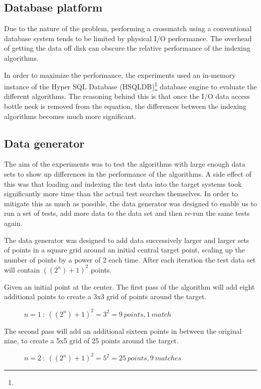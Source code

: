 \documentclass{article}
\newcommand{\hsqldb} {HSQLDB\xspace}
\newcommand{\crossmatch} {crossmatch\xspace}
\newcommand{\hdisk} {disk\xspace}
\newcommand{\footurl}[1] {\footnote{\burl{#1}}}
\begin{document}
\subsection{Database platform}
\label{database-platform}

Due to the nature of the problem, performing a \crossmatch using a conventional database system tends to be limited by physical I/O performance. The overhead of getting the data off \hdisk can obscure the relative performance of the indexing algorithms.

In order to maximize the performance, the experiments used an in-memory instance of the Hyper SQL Database (\hsqldb)\footurl{http://hsqldb.org/} database engine to evaluate the different algorithms. The reasoning behind this is that once the I/O data access bottle neck is removed from the equation, the differences between the indexing algorithms becomes much more significant.

\subsection{Data generator}
\label{test-data-generator}

The aim of the experiments was to test the algorithms with large enough data sets to show up differences in the performance of the algorithms.
A side effect of this was that loading and indexing the test data into the target systems took significantly more time than the actual test searches themselves.
In order to mitigate this as much as possible, the data generator was designed to enable us to run a set of tests, add more data to the data set and then re-run the same tests again.

The data generator was designed to add data successively larger and larger sets of points in a square grid around an initial central target point, scaling up the number of points by a power of 2 each time.
After each iteration the test data set will contain \(((2^n)+1)^2\) points.

Given an initial point at the center. The first pass of the algorithm will add eight additional points to create a 3x3 grid of points around the target. 
\begin{figure}[h]

\caption{$n=1 \ :\ ((2^n)+1)^2 = 3^2 = 9 \ points, 1 \ match$}
\label{fig:data-count-03}
\end{figure}

The second pass will add an additional sixteen points in between the original nine, to create a 5x5 grid of 25 points around the target. 
\begin{figure}[h]

\caption{$n=2 \ :\ ((2^n)+1)^2 = 5^2 = 25 \ points, 9 \ matches$}
\label{fig:data-count-03}
\end{figure}
\end{document}

